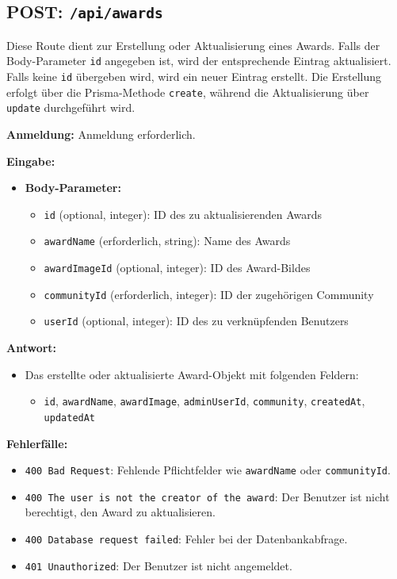 \documentclass[a4paper,12pt]{article}
\begin{document}
\subsection{POST: \texttt{/api/awards}}

Diese Route dient zur Erstellung oder Aktualisierung eines Awards. Falls der
Body-Parameter \texttt{id} angegeben ist, wird der entsprechende Eintrag
aktualisiert. Falls keine \texttt{id} übergeben wird, wird ein neuer Eintrag
erstellt. Die Erstellung erfolgt über die Prisma-Methode \texttt{create},
während die Aktualisierung über \texttt{update} durchgeführt wird.

\textbf{Anmeldung:} Anmeldung erforderlich.

\textbf{Eingabe:}
\begin{itemize}
    \item \textbf{Body-Parameter:}
    \begin{itemize}
        \item \texttt{id} (optional, integer):
            ID des zu aktualisierenden Awards
        \item \texttt{awardName} (erforderlich, string):
            Name des Awards
        \item \texttt{awardImageId} (optional, integer):
            ID des Award-Bildes
        \item \texttt{communityId} (erforderlich, integer):
            ID der zugehörigen Community
        \item \texttt{userId} (optional, integer):
            ID des zu verknüpfenden Benutzers
    \end{itemize}
\end{itemize}

\textbf{Antwort:}
\begin{itemize}
    \item Das erstellte oder aktualisierte Award-Objekt mit folgenden Feldern:
    \begin{itemize}
        \item \texttt{id},
              \texttt{awardName},
              \texttt{awardImage},
              \texttt{adminUserId},
              \texttt{community},
              \texttt{createdAt},
              \texttt{updatedAt}
    \end{itemize}
\end{itemize}

\textbf{Fehlerfälle:}
\begin{itemize}
    \item \texttt{400 Bad Request}:
        Fehlende Pflichtfelder wie \texttt{awardName} oder
        \texttt{communityId}.
    \item \texttt{400 The user is not the creator of the award}:
        Der Benutzer ist nicht berechtigt, den Award zu aktualisieren.
    \item \texttt{400 Database request failed}:
        Fehler bei der Datenbankabfrage.
    \item \texttt{401 Unauthorized}:
        Der Benutzer ist nicht angemeldet.
\end{itemize}
\end{document}
